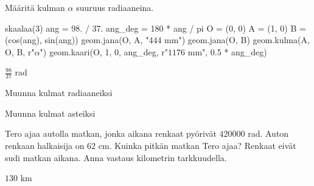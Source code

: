 \begin{tehtavasivu}
\begin{tehtava}
Määritä kulman $\alpha$ suuruus radiaaneina.

\begin{kuva}
skaalaa(3)
ang = 98. / 37.
ang_deg = 180 * ang / pi
O = (0, 0)
A = (1, 0)
B = (cos(ang), sin(ang))
geom.jana(O, A, "$444$ mm")
geom.jana(O, B)
geom.kulma(A, O, B, r"$\alpha$")
geom.kaari(O, 1, 0, ang_deg, r"$1176$ mm", 0.5 * ang_deg)
\end{kuva}

\begin{vastaus}
$\frac{98}{37}$ rad
\end{vastaus}
\end{tehtava}

\begin{tehtava}
Muunna kulmat radiaaneiksi

\begin{vastaus}
\end{vastaus}
\end{tehtava}

\begin{tehtava}
Muunna kulmat asteiksi

\begin{vastaus}
\end{vastaus}
\end{tehtava}

\begin{tehtava}
Tero ajaa autolla matkan, jonka aikana renkaat pyörivät $420000$ rad. Auton renkaan halkaisija on $62$ cm. Kuinka pitkän matkan Tero ajaa? Renkaat eivät sudi matkan aikana. Anna vastaus kilometrin tarkkuudella.
\begin{vastaus}
$130$ km
\end{vastaus}
\end{tehtava}

\end{tehtavasivu}
